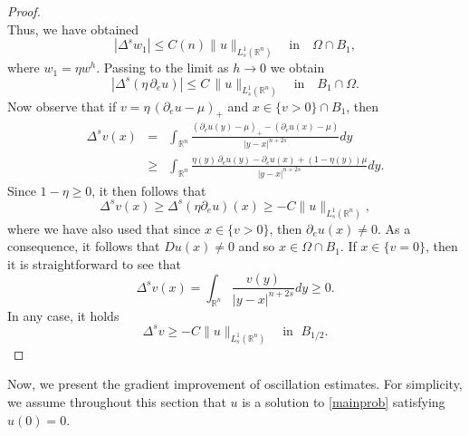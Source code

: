 \documentclass[reqno,11pt]{amsart}
\numberwithin{equation}{section}
\numberwithin{equation}{section}
\begin{document}
\begin{proof}
$$$$
Thus, we have obtained
$$
    \left|\Delta^s w_1 \right| \leq C(n)\|u\|_{L^1_s(\mathbb{R}^n)} \quad \mbox{in} \quad \Omega \cap B_1,
$$
where $w_1 = \eta w^h$. Passing to the limit as $h \to 0$ we obtain
$$
    \left| \Delta^s (\eta \, \partial_e u)\right| \leq C\,\|u\|_{L^1_s(\mathbb{R}^n)} \quad \mbox{in} \quad B_1 \cap \Omega.
$$
Now observe that if $v = \eta\,(\partial_e u - \mu)_+$ and $x \in \{v>0 \}\cap B_1$, then
\begin{eqnarray*}
    \Delta^s v(x) & = & \int_{\mathbb{R}^n}\frac{(\partial_e u(y) - \mu)_+ - (\partial_e u(x) - \mu)}{|y-x|^{n+2s}}dy\\
    & \geq & \int_{\mathbb{R}^n}\frac{\eta(y)\,\partial_e u(y) - \partial_e u(x) + (1-\eta(y))\mu}{|y-x|^{n+2s}}dy.
\end{eqnarray*}
Since $1-\eta \geq 0$, it then follows that
$$
    \Delta^s v(x) \geq \Delta^s (\eta \partial_e u)(x) \geq - C\|u\|_{L^1_s(\mathbb{R}^n)},
$$
where we have also used that since $x \in \{v>0 \}$, then $\partial_e u(x) \not = 0$. As a consequence, it follows that $Du(x) \not = 0$ and so $x \in \Omega \cap B_1$. If $x \in \{v=0 \}$, then it is straightforward to see that
$$
    \Delta^s v(x) = \int_{\mathbb{R}^n}\frac{v(y)}{|y-x|^{n+2s}}dy \geq 0. 
$$
In any case, it holds
$$
    \Delta^s v \geq -C\|u\|_{L^1_s(\mathbb{R}^n)} \quad \mbox{in }\; B_{1/2}.
$$
\end{proof}

Now, we present the gradient improvement of oscillation estimates. For simplicity, we assume throughout this section that \(u\) is a solution to \eqref{mainprob} satisfying \(u(0) = 0\). 
\end{document}
